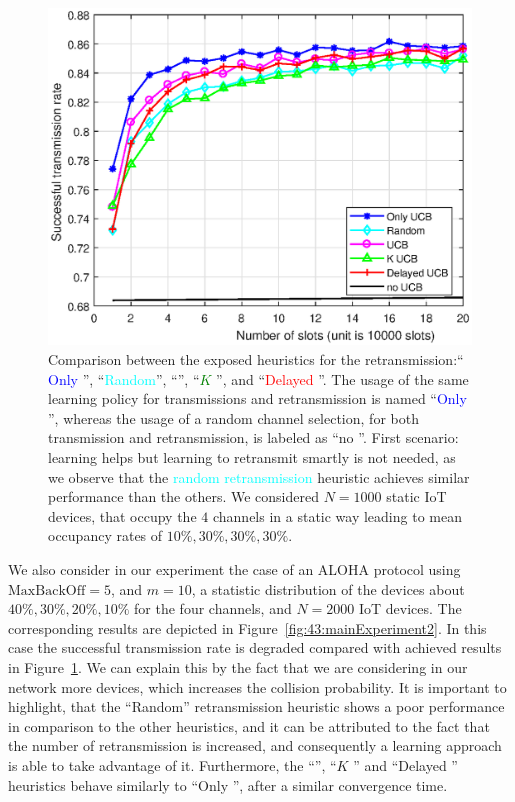 \begin{figure}[h!]  %
	\centering
	\includegraphics[width=0.80\linewidth]{ResultsUCB.eps}
	\caption[First comparison between the exposed heuristics for the retransmission: ``Only \UCB'', ``Random, \UCB'', ``$K$ \UCB'', and ``Delayed \UCB''.]{
		Comparison between the exposed heuristics for the retransmission:`` \textcolor{blue}{Only \UCB}'', ``\textcolor{cyan}{Random}'', ``\textcolor{purple}{\UCB}'', ``\textcolor{green}{$K$ \UCB}'', and ``\textcolor{red}{Delayed \UCB}''.
		The usage of the same learning policy for transmissions and retransmission is named ``\textcolor{blue}{Only \UCB{}}'',
		whereas the usage of a random channel selection, for both transmission and retransmission, is labeled as ``no \UCB{}''.
		First scenario: learning helps but learning to retransmit smartly is not needed, as we observe that the \textcolor{cyan}{random retransmission} heuristic achieves similar performance than the others.
		We considered $N=1000$ static IoT devices, that occupy the $4$ channels in a static way leading to mean occupancy rates of $10\%,30\%,30\%,30\%$.
	}
	\label{fig:43:mainExperiment1}
\end{figure}

We also consider in our experiment the case of an ALOHA protocol using $\mathrm{MaxBackOff}=5$, and $m=10$, a statistic distribution of the devices about $40\%, 30\%, 20\%, 10\%$ for the four channels, and $N=2000$ IoT devices.
The corresponding results are depicted in Figure~\ref{fig:43:mainExperiment2}.
In this case the successful transmission rate is degraded compared with achieved results in Figure~\ref{fig:43:mainExperiment1}.
We can explain this by the fact that we are considering in our network more devices, which increases the collision probability.
It is important to highlight, that the ``Random'' retransmission heuristic shows a poor performance in comparison to the other heuristics, and it can be attributed to the fact that the number of retransmission is increased, and consequently a
learning approach is able to take advantage of it.
Furthermore, the ``\UCB'', ``$K$ \UCB'' and ``Delayed \UCB'' heuristics behave similarly to ``Only \UCB'', after a similar convergence time.

